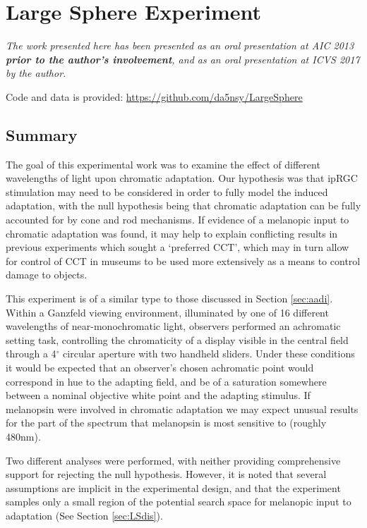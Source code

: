 \chapter{Large Sphere Experiment} %
\label{chap:LargeSphere}

\textit{The work presented here has been presented as an oral presentation at AIC 2013 \citep{macdonald_chromatic_2013} \textbf{prior to the author's involvement}, and as an oral presentation at ICVS 2017 \citep{garside_investigations_2017} by the author.}

Code and data is provided: \url{https://github.com/da5nsy/LargeSphere}

\section{Summary}

The goal of this experimental work was to examine the effect of different wavelengths of light upon chromatic adaptation. Our hypothesis was that \gls{ipRGC} stimulation may need to be considered in order to fully model the induced adaptation, with the null hypothesis being that chromatic adaptation can be fully accounted for by cone and rod mechanisms. If evidence of a melanopic input to chromatic adaptation was found, it may help to explain conflicting results in previous experiments which sought a `preferred \gls{CCT}', which may in turn allow for control of \gls{CCT} in museums to be used more extensively as a means to control damage to objects. 

This experiment is of a similar type to those discussed in Section \ref{sec:aadi}. Within a Ganzfeld viewing environment, illuminated by one of 16 different wavelengths of near-monochromatic light, observers performed an achromatic setting task, controlling the chromaticity of a display visible in the central field through a 4$^{\circ}$ circular aperture with two handheld sliders. Under these conditions it would be expected that an observer's chosen achromatic point would correspond in hue to the adapting field, and be of a saturation somewhere between a nominal objective white point and the adapting stimulus. If melanopsin were involved in chromatic adaptation we may expect unusual results for the part of the spectrum that melanopsin is most sensitive to (roughly 480nm).

Two different analyses were performed, with neither providing comprehensive support for rejecting the null hypothesis. However, it is noted that several assumptions are implicit in the experimental design, and that the experiment samples only a small region of the potential search space for melanopic input to adaptation (See Section \ref{sec:LSdis}).


